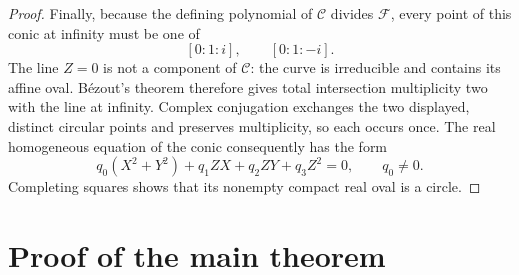 \documentclass[preprints,article,submit,oneauthor]{Definitions/mdpi}
\numberwithin{equation}{section}
\begin{document}
\begin{proof}
Finally, because the defining polynomial of \(\mathscr C\) divides
\(\mathscr F\), every point of this conic at infinity must be one of
\[
 [0:1:i],\qquad[0:1:-i].
\]
The line \(Z=0\) is not a component of \(\mathscr C\): the curve is
irreducible and contains its affine oval.  B\'ezout's theorem therefore gives
total intersection multiplicity two with the line at infinity.  Complex
conjugation exchanges the two
displayed, distinct circular points and preserves multiplicity, so each
occurs once.  The real homogeneous equation of the conic consequently has the
form
\[
 q_0(X^2+Y^2)+q_1ZX+q_2ZY+q_3Z^2=0,
 \qquad q_0\neq0.
\]
Completing squares shows that its nonempty compact real oval is a circle.
\end{proof}

\section{Proof of the main theorem}
\end{document}
